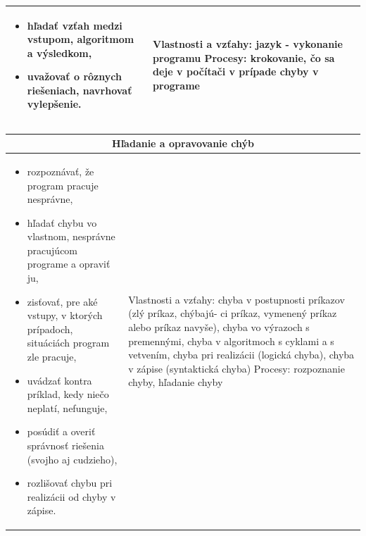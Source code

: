 \documentclass[FP,DP]{tulthesis}
\begin{document}
{{{{{{\begin{table}[t]
\begin{tabular}{|l|l|}
\begin{minipage}[t]{0.45\textwidth}
\begin{itemize}[leftmargin=*,nosep]
\item hľadať vzťah medzi vstupom, algoritmom a výsledkom,
\item uvažovať o rôznych riešeniach, navrhovať vylepšenie.
\end{itemize}
  \end{minipage} &
  \begin{minipage}[t]{0.45\textwidth}
Vlastnosti a vzťahy: jazyk - vykonanie programu
Procesy: krokovanie, čo sa deje v počítači v prípade chyby v programe
 \end{minipage}
\\\hline
\end{tabular}
\end{table}
\clearpage
{\renewcommand{\arraystretch}{1.4}%
\begin{table}[t]
\footnotesize
\center
\begin{tabular}{|l|l|}
\hline
\multicolumn{2}{|c|}{Hľadanie a opravovanie chýb}\\\hline
\begin{minipage}[t]{0.45\textwidth}
\begin{itemize}[leftmargin=*,nosep]
  	\item rozpoznávať, že program pracuje nesprávne,
	\item hľadať chybu vo vlastnom, nesprávne pracujúcom programe
a opraviť ju,
\item zisťovať, pre aké vstupy, v ktorých prípadoch, situáciách program
zle pracuje,

\item uvádzať kontra príklad, kedy niečo neplatí, nefunguje,
\item posúdiť a overiť správnosť riešenia (svojho aj cudzieho),
\item rozlišovať chybu pri realizácii od chyby v zápise.
\end{itemize}
  \end{minipage} &
  \begin{minipage}[t]{0.45\textwidth}
Vlastnosti a vzťahy: chyba v postupnosti príkazov (zlý príkaz, chýbajú-
ci príkaz, vymenený príkaz alebo príkaz navyše), chyba vo výrazoch
s premennými, chyba v algoritmoch s cyklami a s vetvením, chyba pri
realizácii (logická chyba), chyba v zápise (syntaktická chyba)
Procesy: rozpoznanie chyby, hľadanie chyby
 \end{minipage}

\\\hline
\end{tabular}



\end{table}}}}}}}}
\end{document}
